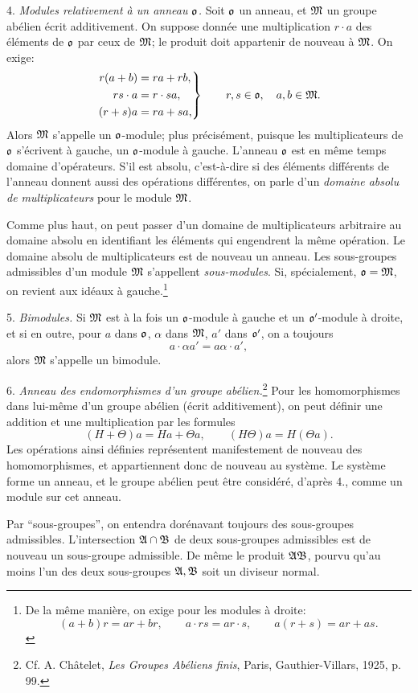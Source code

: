 4. \emph{Modules relativement à un anneau $\mathfrak{o}$.} Soit $\mathfrak{o}$ un anneau, et $\mathfrak{M}$ un groupe abélien écrit additivement. On suppose donnée une multiplication $r\cdot a$ des éléments de $\mathfrak{o}$ par ceux de $\mathfrak{M}$; le produit doit appartenir de nouveau à $\mathfrak{M}$. On exige:
\[
\left.
\begin{aligned}
 r(a+b)&=ra+rb,\\
 rs\cdot a&=r\cdot sa,\\
 (r+s)a&=ra+sa,
\end{aligned}
\right\}\qquad r,s\in\mathfrak{o},\quad a,b\in\mathfrak{M}.
\]
Alors $\mathfrak{M}$ s'appelle un $\mathfrak{o}$-module; plus précisément, puisque les multiplicateurs de $\mathfrak{o}$ s'écrivent à gauche, un $\mathfrak{o}$-module à gauche. L'anneau $\mathfrak{o}$ est en même temps domaine d'opérateurs. S'il est absolu, c'est-à-dire si des éléments différents de l'anneau donnent aussi des opérations différentes, on parle d'un \emph{domaine absolu de multiplicateurs} pour le module $\mathfrak{M}$.

Comme plus haut, on peut passer d'un domaine de multiplicateurs arbitraire au domaine absolu en identifiant les éléments qui engendrent la même opération. Le domaine absolu de multiplicateurs est de nouveau un anneau. Les sous-groupes admissibles d'un module $\mathfrak{M}$ s'appellent \emph{sous-modules}. Si, spécialement, $\mathfrak{o}=\mathfrak{M}$, on revient aux idéaux à gauche.\footnote{De la même manière, on exige pour les modules à droite:
\[
(a+b)r=ar+br,\qquad a\cdot rs=ar\cdot s,\qquad a(r+s)=ar+as.
\]}

5. \emph{Bimodules.} Si $\mathfrak{M}$ est à la fois un $\mathfrak{o}$-module à gauche et un $\mathfrak{o}'$-module à droite, et si en outre, pour $a$ dans $\mathfrak{o}$, $\alpha$ dans $\mathfrak{M}$, $a'$ dans $\mathfrak{o}'$, on a toujours
\[
        a\cdot\alpha a'=a\alpha\cdot a',
\]
alors $\mathfrak{M}$ s'appelle un bimodule.

6. \emph{Anneau des endomorphismes d'un groupe abélien.}\footnote{Cf. A. Châtelet, \emph{Les Groupes Abéliens finis}, Paris, Gauthier-Villars, 1925, p. 99.} Pour les homomorphismes dans lui-même d'un groupe abélien (écrit additivement), on peut définir une addition et une multiplication par les formules
\[
        (H+\Theta)a=Ha+\Theta a,\qquad (H\Theta)a=H(\Theta a).
\]
Les opérations ainsi définies représentent manifestement de nouveau des homomorphismes, et appartiennent donc de nouveau au système. Le système forme un anneau, et le groupe abélien peut être considéré, d'après 4., comme un module sur cet anneau.

Par ``sous-groupes'', on entendra dorénavant toujours des sous-groupes admissibles. L'intersection $\mathfrak{A}\cap\mathfrak{B}$ de deux sous-groupes admissibles est de nouveau un sous-groupe admissible. De même le produit $\mathfrak{A}\mathfrak{B}$, pourvu qu'au moins l'un des deux sous-groupes $\mathfrak{A},\mathfrak{B}$ soit un diviseur normal.
